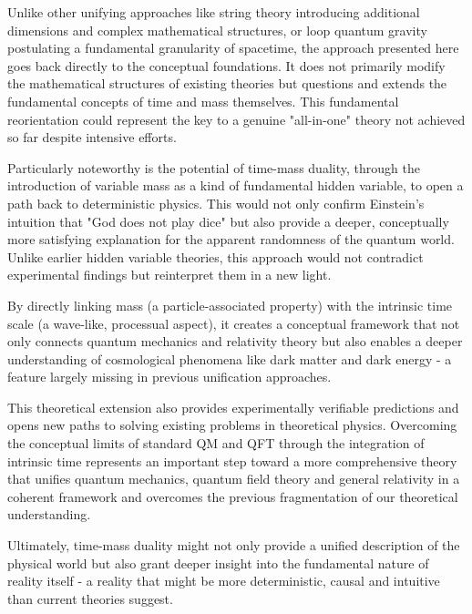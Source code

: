\documentclass[12pt,a4paper]{article}  %
\begin{document}
	Unlike other unifying approaches like string theory introducing additional dimensions and complex mathematical structures, or loop quantum gravity postulating a fundamental granularity of spacetime, the approach presented here goes back directly to the conceptual foundations. It does not primarily modify the mathematical structures of existing theories but questions and extends the fundamental concepts of time and mass themselves. This fundamental reorientation could represent the key to a genuine "all-in-one" theory not achieved so far despite intensive efforts.
	
	Particularly noteworthy is the potential of time-mass duality, through the introduction of variable mass as a kind of fundamental hidden variable, to open a path back to deterministic physics. This would not only confirm Einstein's intuition that "God does not play dice" but also provide a deeper, conceptually more satisfying explanation for the apparent randomness of the quantum world. Unlike earlier hidden variable theories, this approach would not contradict experimental findings but reinterpret them in a new light.
	
	By directly linking mass (a particle-associated property) with the intrinsic time scale (a wave-like, processual aspect), it creates a conceptual framework that not only connects quantum mechanics and relativity theory but also enables a deeper understanding of cosmological phenomena like dark matter and dark energy - a feature largely missing in previous unification approaches.
	
	This theoretical extension also provides experimentally verifiable predictions and opens new paths to solving existing problems in theoretical physics. Overcoming the conceptual limits of standard QM and QFT through the integration of intrinsic time represents an important step toward a more comprehensive theory that unifies quantum mechanics, quantum field theory and general relativity in a coherent framework and overcomes the previous fragmentation of our theoretical understanding.
	
	Ultimately, time-mass duality might not only provide a unified description of the physical world but also grant deeper insight into the fundamental nature of reality itself - a reality that might be more deterministic, causal and intuitive than current theories suggest.
	
\end{document}
